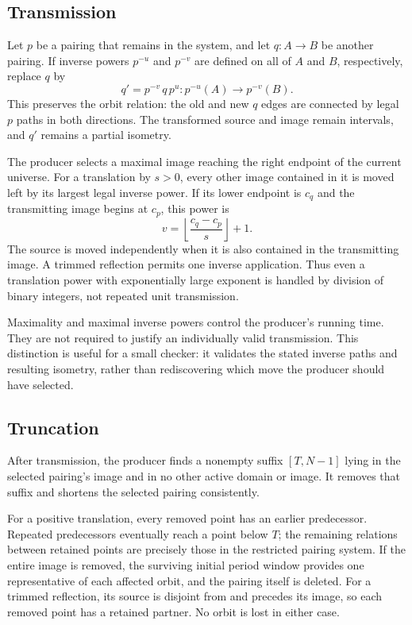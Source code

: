\documentclass[11pt,a4paper]{article}
\theoremstyle{definition}\newtheorem{definition}[theorem]{Definition}
\theoremstyle{remark}\newtheorem{remark}[theorem]{Remark}
\begin{document}
\subsection{Transmission}

Let $p$ be a pairing that remains in the system, and let $q:A\to B$ be
another pairing. If inverse powers $p^{-u}$ and $p^{-v}$ are defined on all
of $A$ and $B$, respectively, replace $q$ by
\[
 q'=p^{-v}\,q\,p^u: p^{-u}(A)\longrightarrow p^{-v}(B).
\]
This preserves the orbit relation: the old and new $q$ edges are connected
by legal $p$ paths in both directions. The transformed source and image
remain intervals, and $q'$ remains a partial isometry.

The producer selects a maximal image reaching the right endpoint of the
current universe. For a translation by $s>0$, every other image contained in
it is moved left by its largest legal inverse power. If its lower endpoint
is $c_q$ and the transmitting image begins at $c_p$, this power is
\[
 v=\left\lfloor\frac{c_q-c_p}{s}\right\rfloor+1.
\]
The source is moved independently when it is also contained in the
transmitting image. A trimmed reflection permits one inverse application.
Thus even a translation power with exponentially large exponent is handled
by division of binary integers, not repeated unit transmission.

Maximality and maximal inverse powers control the producer's running time.
They are not required to justify an individually valid transmission. This
distinction is useful for a small checker: it validates the stated inverse
paths and resulting isometry, rather than rediscovering which move the
producer should have selected.

\subsection{Truncation}

After transmission, the producer finds a nonempty suffix $[T,N-1]$ lying in
the selected pairing's image and in no other active domain or image. It
removes that suffix and shortens the selected pairing consistently.

For a positive translation, every removed point has an earlier predecessor.
Repeated predecessors eventually reach a point below $T$; the remaining
relations between retained points are precisely those in the restricted
pairing system. If the entire image is removed, the surviving initial
period window provides one representative of each affected orbit, and the
pairing itself is deleted. For a trimmed reflection, its source is disjoint
from and precedes its image, so each removed point has a retained partner.
No orbit is lost in either case.
\end{document}
